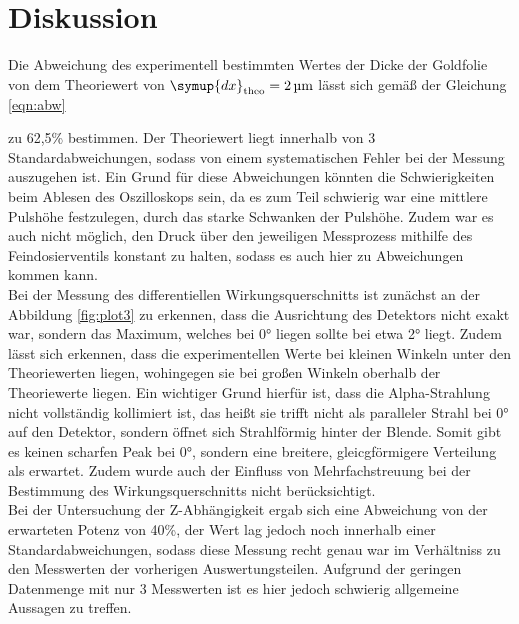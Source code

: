 \section{Diskussion}
\label{sec:Diskussion}
Die Abweichung des experimentell bestimmten Wertes der Dicke der Goldfolie von dem
Theoriewert von $\symup{dx}_{\text{theo}}=\SI{2}{\micro\meter}$
lässt sich gemäß der Gleichung \ref{eqn:abw}

zu 62,5\% bestimmen. Der Theoriewert liegt innerhalb von 3 Standardabweichungen,
sodass von einem systematischen Fehler bei der Messung auszugehen ist. Ein Grund für diese
Abweichungen könnten die Schwierigkeiten beim Ablesen des Oszilloskops sein, da es zum Teil
schwierig war eine mittlere Pulshöhe festzulegen, durch das starke Schwanken der
Pulshöhe. Zudem war es auch nicht möglich, den Druck über den jeweiligen Messprozess mithilfe
des Feindosierventils konstant zu halten, sodass es auch hier zu Abweichungen kommen kann.
\\
Bei der Messung des differentiellen Wirkungsquerschnitts ist zunächst an der Abbildung
\ref{fig:plot3} zu erkennen, dass die Ausrichtung des Detektors nicht exakt war, sondern das
Maximum, welches bei 0° liegen sollte bei etwa 2° liegt. Zudem lässt sich erkennen,
dass die experimentellen Werte bei kleinen Winkeln unter den Theoriewerten liegen, wohingegen
sie bei großen Winkeln oberhalb der Theoriewerte liegen. Ein wichtiger Grund hierfür ist, dass die Alpha-Strahlung
nicht vollständig kollimiert ist, das heißt sie trifft nicht als paralleler Strahl bei 0° auf den Detektor,
sondern öffnet sich Strahlförmig hinter der Blende. Somit gibt es keinen scharfen Peak bei 0°,
sondern eine breitere, gleicgförmigere Verteilung als erwartet. Zudem wurde auch der Einfluss
von Mehrfachstreuung bei der Bestimmung des Wirkungsquerschnitts nicht berücksichtigt. \\
Bei der Untersuchung der Z-Abhängigkeit ergab sich eine Abweichung von der erwarteten
Potenz von 40\%, der Wert lag jedoch noch innerhalb einer Standardabweichungen, sodass diese Messung recht
genau war im Verhältniss zu den Messwerten der vorherigen Auswertungsteilen. Aufgrund der geringen Datenmenge mit nur 3
Messwerten ist es hier jedoch schwierig allgemeine Aussagen zu treffen.
